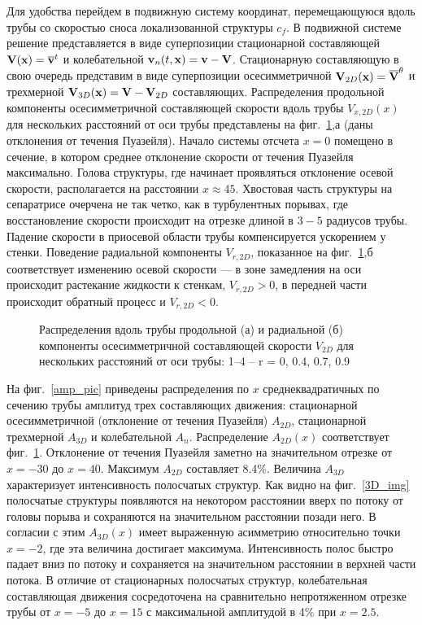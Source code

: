Для удобства перейдем в подвижную систему координат, перемещающуюся вдоль трубы со скоростью сноса локализованной структуры $c_f$. В подвижной системе решение представляется в виде суперпозиции стационарной составляющей $\mathbf{V}(\mathbf{x}) = \overline{\mathbf{v}}^t$ и колебательной $\mathbf{v}_n(t,\mathbf{x}) = \mathbf{v} - \mathbf{V}$. Стационарную составляющую в свою очередь представим в виде суперпозиции осесимметричной $\mathbf{V}_{2D}(\mathbf{x}) = \overline{\mathbf{V}}^{\theta}$ и трехмерной $\mathbf{V}_{3D}(\mathbf{x})=\mathbf{V} - \mathbf{V}_{2D}$ составляющих. Распределения продольной компоненты осесимметричной составляющей скорости вдоль трубы $V_{x,2D}(x)$ для нескольких расстояний от оси трубы представлены на фиг.~\ref{U2D_pic},а (даны отклонения от течения Пуазейля). Начало системы отсчета $x=0$ помещено в сечение, в котором среднее отклонение скорости от течения Пуазейля максимально. Голова структуры, где начинает проявляться отклонение осевой скорости, располагается на расстоянии $x \approx 45$. Хвостовая часть структуры на сепаратрисе очерчена не так четко, как в турбулентных порывах, где восстановление скорости происходит на отрезке длиной в $3-5$ радиусов трубы.  Падение скорости в приосевой области трубы компенсируется ускорением у стенки. Поведение радиальной компоненты $V_{r,2D}$, показанное на фиг.~\ref{U2D_pic},б соответствует изменению осевой скорости --- в зоне замедления на оси происходит растекание жидкости к стенкам, $V_{r,2D}>0$, в передней части происходит обратный процесс и $V_{r,2D}<0$.

\begin{figure}[h]
\caption{Распределения вдоль трубы продольной (а) и радиальной (б) компоненты осесимметричной составляющей скорости $V_{2D}$ для нескольких расстояний от оси
трубы: 1–4 – r = 0, 0.4, 0.7, 0.9}
\label{U2D_pic}
\end{figure}

На фиг.~\ref{amp_pic} приведены распределения по $x$ среднеквадратичных по сечению трубы амплитуд трех составляющих движения: стационарной осесимметричной (отклонение от течения Пуазейля) $A_{2D}$, стационарной трехмерной $A_{3D}$ и колебательной $A_n$. Распределение $A_{2D}(x)$ соответствует фиг.~\ref{U2D_pic}. Отклонение от течения Пуазейля заметно на значительном отрезке от $x=-30$ до $x=40$. Максимум $A_{2D}$ составляет 8.4\%. Величина $A_{3D}$ характеризует интенсивность полосчатых структур. Как видно на фиг.~\ref{3D_img} полосчатые структуры появляются на некотором расстоянии вверх по потоку от головы порыва и сохраняются на значительном расстоянии позади него. В согласии с этим $A_{3D}(x)$ имеет выраженную асимметрию относительно точки $x=-2$, где эта величина достигает максимума. Интенсивность полос быстро падает вниз по потоку и сохраняется на значительном расстоянии в верхней части потока. В отличие от стационарных полосчатых структур, колебательная составляющая движения сосредоточена на сравнительно непротяженном отрезке трубы от $x=-5$ до $x=15$ с максимальной амплитудой в 4\% при $x=2.5$.

